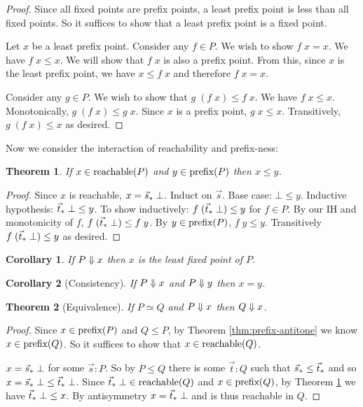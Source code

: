 \documentclass{article}
\newcommand{\todo}[1]{{\color{red}{#1}}}
\newtheorem{theorem}{Theorem}
\newtheorem{corollary}{Corollary}
\begin{document}
\begin{proof}
  Since all fixed points are prefix points, a least prefix point is less than
  all fixed points. So it suffices to show that a least prefix point is a fixed
  point.

  Let $x$ be a least prefix point. Consider any $f \in P$. We wish to show $f\;x
  = x$. We have $f\; x \le x$. We will show that $f\;x$ is also a prefix point.
  From this, since $x$ is the least prefix point, we have $x \le f\;x$ and
  therefore $f\;x = x$.

  Consider any $g \in P$. We wish to show that $g\;(f\;x) \le f\; x$. We have
  $f\;x \le x$. Monotonically, $g\;(f\;x) \le g\;x$. Since $x$ is a prefix
  point, $g\;x \le x$. Transitively, $g\;(f\;x) \le x$ as desired.
\end{proof}

Now we consider the interaction of reachability and prefix-ness:

\begin{theorem}
  If $x \in \text{reachable}(P)$ and $y \in \text{prefix}(P)$ then $x \le y$.
  \label{thm:reachable<=prefix}
\end{theorem}

\begin{proof}
  Since $x$ is reachable, $x = {\vec{s}_*}\; \bot$. Induct on $\vec{s}$. Base case:
  $\bot \le y$. Inductive hypothesis: ${\vec{t}_*}\; \bot \le y$. To show
  inductively: $f\; ({\vec{t}_*}\; \bot) \le y$ for $f \in P$. By our IH and
  monotonicity of $f$, $f\;({\vec{t}_*}\; \bot) \le f\; y$. By $y \in \text{prefix}(P)$,
  $f\;y \le y$. Transitively $f\; ({\vec{t}_*}\; \bot) \le y$ as desired.
\end{proof}

\begin{corollary}
  If $P \Downarrow x$ then $x$ is the least fixed point of $P$.
\end{corollary}

\begin{corollary}[Consistency]
  If $P \Downarrow x$ and $P \Downarrow y$ then $x = y$.
  \label{cor:consistency}
\end{corollary}

\todo{Couldn't I prove a more traditional ``confluence'' theorem as well?}

\begin{theorem}[Equivalence]
  If $P \simeq Q$ and $P \Downarrow x$ then $Q \Downarrow x$.
  \label{thm:equivalence}
\end{theorem}

\begin{proof}
  Since $x \in \text{prefix}(P)$ and $Q \le P$, by Theorem \ref{thm:prefix-antitone}
  we know $x \in \text{prefix}(Q)$. So it suffices to show that $x \in \text{reachable}(Q)$.

  $x = {\vec{s}_*}\;\bot$ for some $\vec{s} : P$. So by $P \le Q$ there is some
  $\vec{t} : Q$ such that ${\vec{s}_*} \le {\vec{t}_*}$ and so $x = {\vec{s}_*}\; \bot \le
  {\vec{t}_*}\;\bot$. Since ${\vec{t}_*}\;\bot \in \text{reachable}(Q)$ and $x \in \text{prefix}(Q)$, by
  Theorem \ref{thm:reachable<=prefix} we have ${\vec{t}_*}\;\bot \le x$. By
  antisymmetry $x = {\vec{t}_*}\;\bot$ and is thus reachable in $Q$.
\end{proof}
\end{document}
